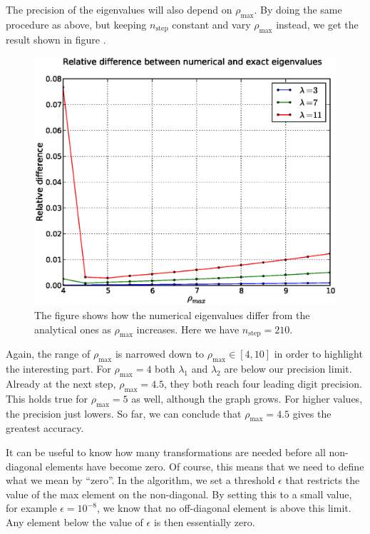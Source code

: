 The precision of the eigenvalues will also depend on $\rho_{\mathrm{max}}$. By doing the same
procedure as above, but keeping $n_{\mathrm{step}}$ constant and vary $\rho_{\mathrm{max}}$ instead, we
get the result shown in figure .
%
\begin{figure}[htpb]
	\centering
	\includegraphics[width=1.0\textwidth]{images/reldiff2.eps}
	\caption{The figure shows how the numerical eigenvalues differ from the analytical
		ones as $\rho_{\mathrm{max}}$ increases. Here we have $n_{\mathrm{step}} = 210$.}
	\label{fig:rhoreldiff}
\end{figure}
%
Again, the range of $\rho_{\mathrm{max}}$ is narrowed down to $\rho_{\mathrm{max}} \in [4,10]$ in order to
highlight the interesting part. For $\rho_{\mathrm{max}} = 4$ both $\lambda_1$ and $\lambda_2$ are
below our precision limit. Already at the next step, $\rho_{\mathrm{max}} = 4.5$, they both
reach four leading digit precision. This holds true for $\rho_{\mathrm{max}} = 5$ as well, although
the graph grows. For higher values, the precision just lowers.
So far, we can conclude that $\rho_{\mathrm{max}} = 4.5$ gives the greatest accuracy.

It can be useful to know how many transformations are needed before all non-diagonal
elements have become zero. Of course, this means that we need to define what we mean by
``zero''. In the algorithm, we set a threshold $\epsilon$ that restricts the value of the
max element on the non-diagonal. By setting this to a small value, for example $\epsilon =
10^{-8}$, we know that no off-diagonal element is above this limit. Any element below the
value of $\epsilon$ is then essentially zero.

